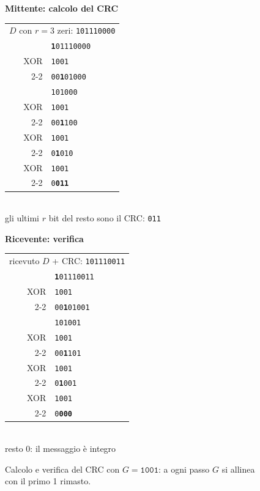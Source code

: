\begin{figure}[H]
\centering
\begin{minipage}{0.47\linewidth}
\centering\textbf{\small Mittente: calcolo del CRC}\\[4pt]
\begin{tabular}{r@{\,}l}
\multicolumn{2}{l}{\small $D$ con $r=3$ zeri: \texttt{101110\textcolor{netred}{000}}} \\[3pt]
& \texttt{\textbf{1}01110000} \\
XOR & \texttt{1001\phantom{00000}} \\ \cline{2-2}
& \texttt{00\textbf{1}01000\phantom{0}}\\[-2pt]
& \texttt{\phantom{00}101000\phantom{0}} \\
XOR & \texttt{\phantom{00}1001\phantom{000}} \\ \cline{2-2}
& \texttt{\phantom{00}00\textbf{1}100\phantom{0}} \\
XOR & \texttt{\phantom{0000}1001\phantom{0}} \\ \cline{2-2}
& \texttt{\phantom{0000}0\textbf{1}010} \\
XOR & \texttt{\phantom{00000}1001} \\ \cline{2-2}
& \texttt{\phantom{00000}0\textcolor{netred}{\textbf{011}}} \\
\end{tabular}\\[4pt]
{\small gli ultimi $r$ bit del resto sono il CRC: \textcolor{netred}{\texttt{011}}}
\end{minipage}\hfill
\begin{minipage}{0.47\linewidth}
\centering\textbf{\small Ricevente: verifica}\\[4pt]
\begin{tabular}{r@{\,}l}
\multicolumn{2}{l}{\small ricevuto $D$ + CRC: \texttt{101110\textcolor{netred}{011}}} \\[3pt]
& \texttt{\textbf{1}01110011} \\
XOR & \texttt{1001\phantom{00000}} \\ \cline{2-2}
& \texttt{00\textbf{1}01001\phantom{0}}\\[-2pt]
& \texttt{\phantom{00}101001\phantom{0}} \\
XOR & \texttt{\phantom{00}1001\phantom{000}} \\ \cline{2-2}
& \texttt{\phantom{00}00\textbf{1}101\phantom{0}} \\
XOR & \texttt{\phantom{0000}1001\phantom{0}} \\ \cline{2-2}
& \texttt{\phantom{0000}0\textbf{1}001} \\
XOR & \texttt{\phantom{00000}1001} \\ \cline{2-2}
& \texttt{\phantom{00000}0\textcolor{netgreen!60!black}{\textbf{000}}} \\
\end{tabular}\\[4pt]
{\small resto 0: il messaggio è integro}
\end{minipage}
\caption{Calcolo e verifica del CRC con $G = \texttt{1001}$: a ogni passo $G$ si allinea con il primo 1 rimasto.}
\end{figure}


